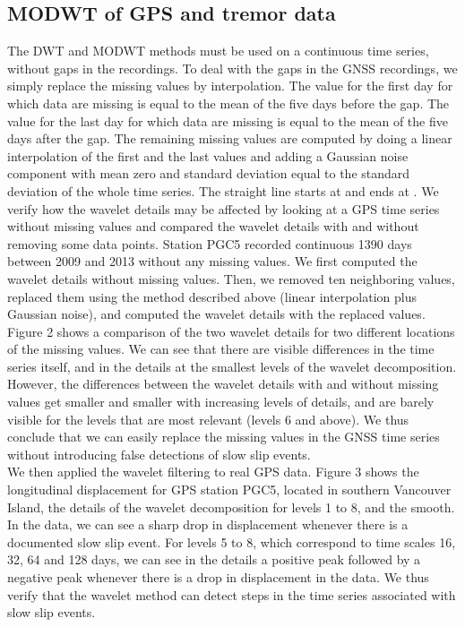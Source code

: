 \documentclass{article}
\begin{document}
\subsection{MODWT of GPS and tremor data}

The DWT and MODWT methods must be used on a continuous time series, without gaps in the recordings. To deal with the gaps in the GNSS recordings, we simply replace the missing values by interpolation. The value for the first day for which data are missing is equal to the mean of the five days before the gap. The value for the last day for which data are missing is equal to the mean of the five days after the gap. The remaining missing values are computed by doing a linear interpolation of the first and the last values and adding a Gaussian noise component with mean zero and standard deviation equal to the standard deviation of the whole time series. The straight line starts at and ends at . We verify how the wavelet details may be affected by looking at a GPS time series without missing values and compared the wavelet details with and without removing some data points. Station PGC5 recorded continuous 1390 days between 2009 and 2013 without any missing values. We first computed the wavelet details without missing values. Then, we removed ten neighboring values, replaced them using the method described above (linear interpolation plus Gaussian noise), and computed the wavelet details with the replaced values. Figure 2 shows a comparison of the two wavelet details for two different locations of the missing values. We can see that there are visible differences in the time series itself, and in the details at the smallest levels of the wavelet decomposition. However, the differences between the wavelet details with and without missing values get smaller and smaller with increasing levels of details, and are barely visible for the levels that are most relevant (levels 6 and above). We thus conclude that we can easily replace the missing values in the GNSS time series without introducing false detections of slow slip events. \\

We then applied the wavelet filtering to real GPS data. Figure 3 shows the longitudinal displacement for GPS station PGC5, located in southern Vancouver Island, the details of the wavelet decomposition for levels 1 to 8, and the smooth. In the data, we can see a sharp drop in displacement whenever there is a documented slow slip event. For levels 5 to 8, which correspond to time scales 16, 32, 64 and 128 days, we can see in the details a positive peak followed by a negative peak whenever there is a drop in displacement in the data. We thus verify that the wavelet method can detect steps in the time series associated with slow slip events. \\
\end{document}
